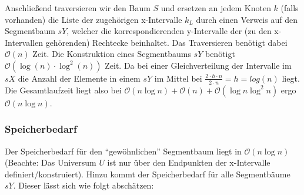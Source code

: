 \documentclass[a4paper]{article}
\begin{document}
Anschließend traversieren wir den Baum $S$ und ersetzen an jedem Knoten $k$ (falls vorhanden)
die Liste der zugehörigen x-Intervalle $k_L$ durch einen Verweis auf 
den Segmentbaum $sY$, welcher die korrespondierenden y-Intervalle der (zu den x-Intervallen 
gehörenden) Rechtecke beinhaltet. Das Traversieren benötigt dabei $\mathcal{O}(n)$ Zeit.
Die Konstruktion eines Segmentbaums $sY$ benötigt $\mathcal{O}(\log(n) \cdot \log^2(n))$ Zeit. Da bei einer Gleichverteilung der Intervalle im $sX$ die Anzahl der Elemente in einem $sY$ im Mittel bei $\frac{2 \cdot h  \cdot n}{2 \cdot n} = h = log(n)$ liegt.
Die Gesamtlaufzeit liegt also bei $\mathcal{O}(n \log n) + \mathcal{O}(n) + \mathcal{O}(\log n \log^2 n)$ ergo $\mathcal{O}(n \log n)$. 

\subsubsection*{Speicherbedarf}
Der Speicherbedarf für den "`gewöhnlichen"' Segmentbaum liegt  in $\mathcal{O}(n \log n)$ (Beachte: Das Universum $U$ ist nur über den Endpunkten der x-Intervalle
definiert/konstruiert). Hinzu kommt der Speicherbedarf für alle Segmentbäume $sY$.
Dieser lässt sich wie folgt abschätzen:
\end{document}
